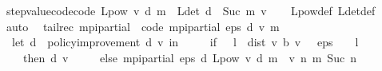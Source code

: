\begin{isabellebody}
\endisatagproof
{\isafoldproof}%
%
\isadelimproof
\isanewline
%
\endisadelimproof
\isanewline
{}\isamarkupfalse%
\ step{\isacharunderscore}{\kern0pt}value{\isacharunderscore}{\kern0pt}code{\isacharbrackleft}{\kern0pt}code{\isacharbrackright}{\kern0pt}{\isacharcolon}{\kern0pt}\ {\isachardoublequoteopen}L{\isacharunderscore}{\kern0pt}pow\ v\ d\ m\ {\isacharequal}{\kern0pt}\ {\isacharparenleft}{\kern0pt}L{\isacharunderscore}{\kern0pt}det\ d\ {\isacharcircum}{\kern0pt}{\isacharcircum}{\kern0pt}\ Suc\ m{\isacharparenright}{\kern0pt}\ v{\isachardoublequoteclose}\isanewline
%
\isadelimproof
\ \ %
\endisadelimproof
%
\isatagproof
{}\isamarkupfalse%
\ L{\isacharunderscore}{\kern0pt}pow{\isacharunderscore}{\kern0pt}def\ L{\isacharunderscore}{\kern0pt}det{\isacharunderscore}{\kern0pt}def\isanewline
\ \ \isamarkupfalse%
\ auto%
\endisatagproof
{\isafoldproof}%
%
\isadelimproof
\isanewline
%
\endisadelimproof
\isanewline
{}\isamarkupfalse%
\ \ {\isacharparenleft}{\kern0pt}tailrec{\isacharparenright}{\kern0pt}\ mpi{\isacharunderscore}{\kern0pt}partial\ \ {\isacharbrackleft}{\kern0pt}code{\isacharbrackright}{\kern0pt}{\isacharcolon}{\kern0pt}\ {\isachardoublequoteopen}mpi{\isacharunderscore}{\kern0pt}partial\ eps\ d\ v\ m\ {\isacharequal}{\kern0pt}\ \isanewline
\ \ {\isacharparenleft}{\kern0pt}let\ d{\isacharprime}{\kern0pt}\ {\isacharequal}{\kern0pt}\ policy{\isacharunderscore}{\kern0pt}improvement\ d\ v\ in\ {\isacharparenleft}{\kern0pt}\isanewline
\ \ \ \ if\ {}\ {\isacharasterisk}{\kern0pt}\ l\ {\isacharasterisk}{\kern0pt}\ dist\ v\ {\isacharparenleft}{\kern0pt}{\isasymL}\isactrlsub b\ v{\isacharparenright}{\kern0pt}\ {\isacharless}{\kern0pt}\ \ eps\ {\isacharasterisk}{\kern0pt}\ {\isacharparenleft}{\kern0pt}{}\ {\isacharminus}{\kern0pt}\ l{\isacharparenright}{\kern0pt}\isanewline
\ \ \ \ then\ {\isacharparenleft}{\kern0pt}d{\isacharprime}{\kern0pt}{\isacharcomma}{\kern0pt}\ v{\isacharparenright}{\kern0pt}\ \isanewline
\ \ \ \ else\ mpi{\isacharunderscore}{\kern0pt}partial\ eps\ d{\isacharprime}{\kern0pt}\ {\isacharparenleft}{\kern0pt}L{\isacharunderscore}{\kern0pt}pow\ v\ d{\isacharprime}{\kern0pt}\ {\isacharparenleft}{\kern0pt}m\ {}\ v{\isacharparenright}{\kern0pt}{\isacharparenright}{\kern0pt}\ {\isacharparenleft}{\kern0pt}{\isasymlambda}n{\isachardot}{\kern0pt}\ m\ {\isacharparenleft}{\kern0pt}Suc\ n{\isacharparenright}{\kern0pt}{\isacharparenright}{\kern0pt}{\isacharparenright}{\kern0pt}{\isacharparenright}{\kern0pt}{\isachardoublequoteclose}\isanewline

\end{isabellebody}
